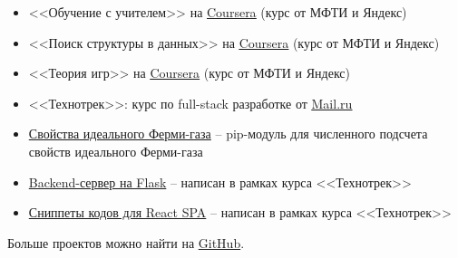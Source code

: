 
\begin{itemize}
	\item <<Обучение с учителем>> на \href{https://www.coursera.org/learn/supervised-learning?specialization=machine-learning-data-analysis}{\underline{Coursera}} (курс от МФТИ и Яндекс)
	\item <<Поиск структуры в данных>> на \href{https://www.coursera.org/learn/unsupervised-learning?specialization=machine-learning-data-analysis}{\underline{Coursera}} (курс от МФТИ и Яндекс)
	\item <<Теория игр>> на \href{https://www.coursera.org/learn/gametheory}{\underline{Coursera}} (курс от МФТИ и Яндекс)
	\item <<Технотрек>>: курс по full-stack разработке от \href{https://track.mail.ru/}{\underline{Mail.ru}}
\end{itemize}


\begin{itemize}
    \item \href{https://github.com/alekseik1/ifg-py}{Свойства идеального Ферми-газа} -- pip-модуль для численного подсчета свойств идеального Ферми-газа
    \item \href{https://github.com/alekseik1/tt-ridesharing-backend}{Backend-сервер на Flask} -- написан в рамках курса <<Технотрек>>
    \item \href{https://github.com/alekseik1/2018-FS-11-Frontend-Kozharin}{Сниппеты кодов для React SPA} -- написан в рамках курса <<Технотрек>>
\end{itemize}
Больше проектов можно найти на \href{https://github.com/alekseik1/}{GitHub}.


